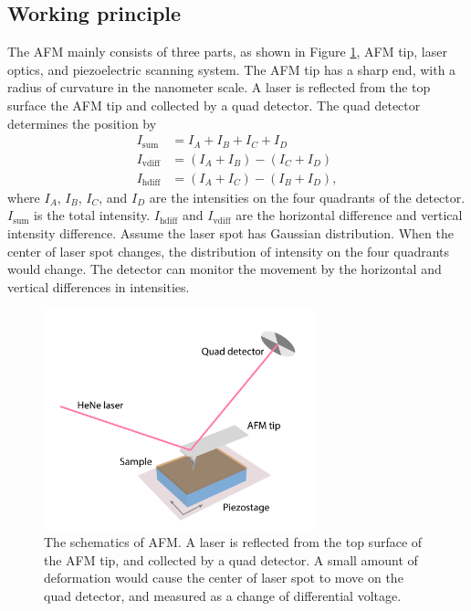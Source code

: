 \documentclass[pdflatex, sectionletters, 12pt, final, phd]{pittetd}    %
\begin{document}
\subsection{Working principle}

The AFM mainly consists of three parts, as shown in Figure \ref{FIG:AFM}, AFM tip, laser optics, and piezoelectric scanning system. The AFM tip has a sharp end, with a radius of curvature in the nanometer scale. A laser is reflected from the top surface the AFM tip and collected by a quad detector. The quad detector determines the position by
\begin{equation}
\begin{split}
I_\mathrm{sum} & = I_A + I_B + I_C + I_D \\ 
I_\mathrm{vdiff} & = (I_A + I_B) - (I_C + I_D) \\ 
I_\mathrm{hdiff} & = (I_A + I_C) - (I_B + I_D),
\end{split}
\end{equation}
where $I_A$, $I_B$, $I_C$, and $I_D$ are the intensities on the four quadrants of the detector. $I_\mathrm{sum}$ is the total intensity. $I_\mathrm{hdiff}$ and $I_\mathrm{vdiff}$ are the horizontal difference and vertical intensity difference. Assume the laser spot has Gaussian distribution. When the center of laser spot changes, the distribution of intensity on the four quadrants would change. The detector can monitor the movement by the horizontal and vertical differences in intensities. 

\begin{figure}[h!]
	\centering
	\includegraphics[width=0.7\textwidth]{Drawing/AFM.pdf}
	\caption[The schematics of AFM]{The schematics of AFM. A laser is reflected from the top surface of the AFM tip, and collected by a quad detector. A small amount of deformation would cause the center of laser spot to move on the quad detector, and measured as a change of differential voltage.}
	\label{FIG:AFM}
\end{figure}
\end{document}
